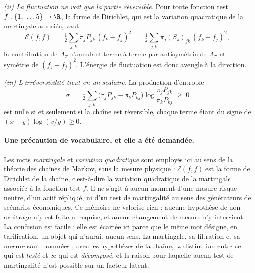 \emph{(ii) La fluctuation ne voit que la partie réversible.} Pour toute fonction test
$f:\{1,\dots,5\}\to\R$, la forme de Dirichlet, qui est la variation quadratique de la martingale
associée, vaut
\begin{equation}
  \mathcal{E}(f,f) \;=\; \tfrac12\sum_{j,k}\pi_j P_{jk}\,(f_k-f_j)^2
                  \;=\; \tfrac12\sum_{j,k}\pi_j (S_\pi)_{jk}\,(f_k-f_j)^2 ,
\end{equation}
la contribution de $A_\pi$ s'annulant terme à terme par antisymétrie de $A_\pi$ et symétrie de
$(f_k-f_j)^2$. L'énergie de fluctuation est donc aveugle à la direction.

\emph{(iii) L'irréversibilité tient en un scalaire.} La production d'entropie
\begin{equation}
  \sigma \;=\; \tfrac12\sum_{j,k}\bigl(\pi_j P_{jk}-\pi_k P_{kj}\bigr)
                \log\frac{\pi_j P_{jk}}{\pi_k P_{kj}} \;\geq\; 0
  \label{eq:entropie}
\end{equation}
est nulle si et seulement si la chaîne est réversible, chaque terme étant du signe de
$(x-y)\log(x/y)\geq 0$.

\paragraph{Une précaution de vocabulaire, et elle a été demandée.} Les mots \emph{martingale} et
\emph{variation quadratique} sont employés ici au sens de la théorie des chaînes de Markov, sous
la mesure physique : $\mathcal{E}(f,f)$ est la forme de Dirichlet de la chaîne, c'est-à-dire
la variation quadratique de la martingale associée à la fonction test $f$. Il ne s'agit à aucun
moment d'une mesure risque-neutre, d'un actif répliqué, ni d'un \og{}test de
martingalité\fg{} au sens des générateurs de scénarios économiques. Ce mémoire ne valorise
rien : aucune hypothèse de non-arbitrage n'y est faite ni requise, et aucun changement de
mesure n'y intervient. La confusion est facile ; elle est écartée ici
parce que le même mot désigne, en tarification, un objet qui n'aurait aucun sens. La
martingale, sa filtration et sa mesure sont nommées \matcomp, avec les hypothèses de la
chaîne, la distinction entre ce qui est \emph{testé} et ce qui est \emph{décomposé}, et la
raison pour laquelle aucun test de martingalité n'est possible sur un facteur latent.

